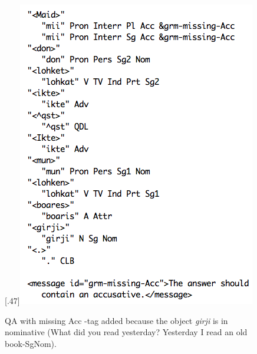 \documentclass[11pt]{article}
\begin{document}
\begin{figure}[htbp]
\begin{center}
\scalebox{.47}[.47]{\includegraphics{presentation/img/vasta_feedback2.png}}
\caption{QA with missing Acc -tag added because the object \textit{girji} is in nominative (What did you read yesterday? Yesterday I read an old book-SgNom).}
\label{maidlohket}
\end{center}
\end{figure}

%
\end{document}
